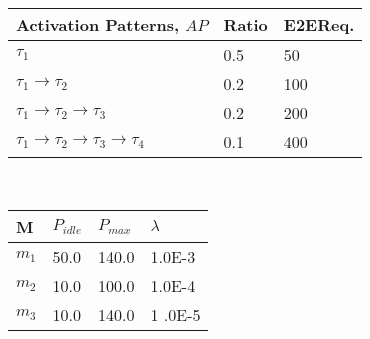 \begin{minipage}{.6\columnwidth}%
\centering
\begin{tabular}{@{}lll@{}}
\toprule
Activation Patterns, $AP$ & Ratio & E2EReq. \\ \midrule
$\tau_1$ & 0.5  & 50\\
$\tau_1\rightarrow\tau_2$ & 0.2  & 100\\
$\tau_1\rightarrow\tau_2\rightarrow\tau_3$ & 0.2  & 200\\
$\tau_1\rightarrow\tau_2\rightarrow\tau_3\rightarrow\tau_4$ & 0.1  & 400\\
\bottomrule
\end{tabular}
\label{tbl_nodes_config}
\end{minipage}~
\begin{minipage}{.4\columnwidth}
\centering
\begin{tabular}{@{}llll@{}}
\toprule
M  & $P_{idle}$& $P_{max}$& $\lambda$ \\ \midrule
$m_1$ & 50.0& 140.0 &1.0E-3  \\
$m_2$ & 10.0& 100.0 &1.0E-4  \\
$m_3$ & 10.0& 140.0 &1 .0E-5 \\ \bottomrule
\end{tabular}
\end{minipage}

